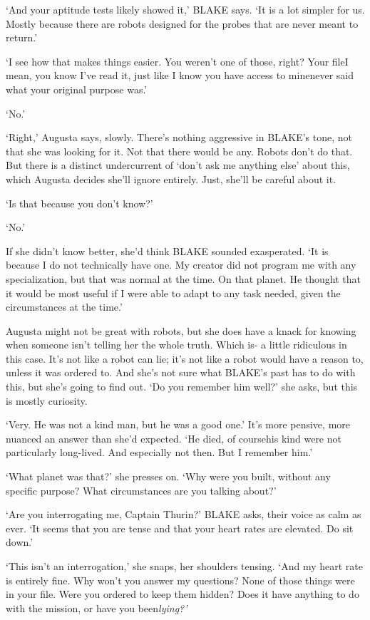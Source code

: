`And your aptitude tests likely showed it,' BLAKE says. `It is a lot
simpler for us. Mostly because there are robots designed for the
probes that are never meant to return.'

`I see how that makes things easier. You weren't one of those, right?
Your file\textemdash I mean, you know I've read it, just like I
know you have access to mine\textemdash never said what your
original purpose was.'

`No.'

`Right,' Augusta says, slowly. There's nothing aggressive in BLAKE's
tone, not that she was looking for it. Not that there would be
any. Robots don't do that. But there is a distinct undercurrent of
`don't ask me anything else' about this, which Augusta decides she'll
ignore entirely. Just, she'll be careful about it.

`Is that because you don't know?'

`No.'

If she didn't know better, she'd think BLAKE sounded exasperated. `It
is because I do not technically have one. My creator did not program
me with any specialization, but that was normal at the time. On that
planet. He thought that it would be most useful if I were able to
adapt to any task needed, given the circumstances at the time.'

Augusta might not be great with robots, but she does have a knack for
knowing when someone isn't telling her the whole truth. Which is- a
little ridiculous in this case. It's not like a robot can lie; it's
not like a robot would have a reason to, unless it was ordered to. And
she's not sure what BLAKE's past has to do with this, but she's going
to find out.  `Do you remember him well?' she asks, but this is mostly
curiosity.

`Very. He was not a kind man, but he was a good one.' It's more
pensive, more nuanced an answer than she'd expected. `He died, of
course\textemdash his kind were not particularly long-lived. And
especially not then. But I remember him.'

`What planet was that?' she presses on. `Why were you built, without
any specific purpose? What circumstances are you talking about?'

`Are you interrogating me, Captain Thurin?' BLAKE asks, their voice as
calm as ever. `It seems that you are tense and that your heart rates
are elevated. Do sit down.'

`This isn't an interrogation,' she snaps, her shoulders tensing. `And
my heart rate is entirely fine. Why won't you answer my questions?
None of those things were in your file. Were you ordered to keep them
hidden? Does it have anything to do with the mission, or have you
been\textellipsis \emph{lying?'}

